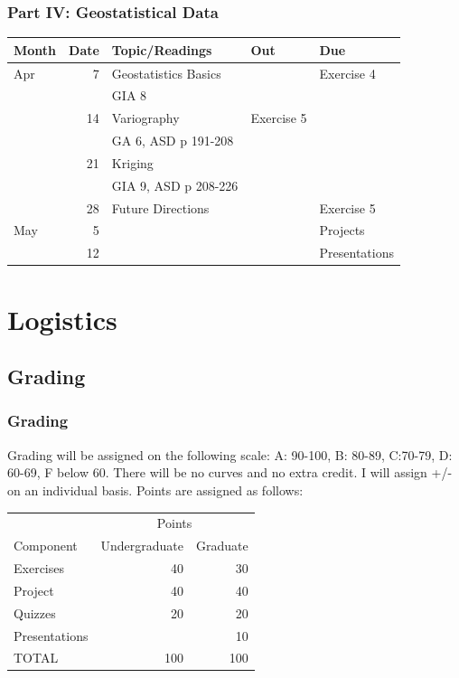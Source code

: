 \documentclass[nototal]{beamer}
\begin{document}
\begin{frame}
	\frametitle{Part IV: Geostatistical Data}
  \begin{center}
    \begin{footnotesize}
\begin{tabular}{|lr|l|l|l|}
\hline
Month & \multicolumn{1}{l|}{Date} & Topic/Readings & Out & Due \\ \hline
Apr & 7 & Geostatistics Basics &  & Exercise 4 \\ 
    &    & GIA 8& &\\
 & 14 & Variography& Exercise 5 &  \\ 
    &    &  GA 6, ASD p 191-208 & &\\
 & 21 & Kriging &  &  \\ 
    &    & GIA 9, ASD p 208-226& &\\
 & 28 & Future Directions &  & Exercise 5 \\ 
May & 5 &  &  & Projects \\ 
 & 12 &  &  & Presentations \\ \hline
\end{tabular}
    \end{footnotesize}
  \end{center}
 \end{frame} 

\section{Logistics} 

\subsection{Grading} 

\begin{frame}
	\frametitle{Grading}
 
 Grading will be assigned on the following scale: A: 90-100, B:
80-89, C:70-79, D: 60-69, F below 60. There will be no curves and no extra
credit. I will assign +/- on an individual basis. Points are assigned as
follows:

\vspace{.1in}
\begin{center}
\begin{tabular}[h]{|l|rr|}
  \hline
  &\multicolumn{2}{|c|}{Points}\\
  Component&Undergraduate&Graduate\\
  \hline
  Exercises&40&30\\
  Project&40&40\\
  Quizzes&20&20\\
  Presentations& &10\\
  \hline
  TOTAL&100&100\\ \hline
\end{tabular}
\end{center}
\vspace{.1in}

\end{frame} 
\end{document}
